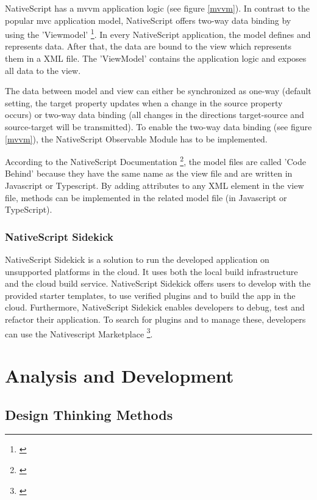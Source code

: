 NativeScript has a \ac{mvvm} application logic (see figure \ref{mvvm}). In contrast to the popular \ac{mvc} application model, NativeScript offers two-way data binding by using the 'Viewmodel' \footnote{\cite{nativescript}}. In every NativeScript application, the model defines and represents data. After that, the data are bound to the view which represents them in a XML file. The 'ViewModel' contains the application logic and exposes all data to the view. 

The data between model and view can either be synchronized as one-way (default setting, the target property updates when a change in the source property occurs) or two-way data binding (all changes in the directions target-source and source-target will be transmitted). To enable the two-way data binding (see figure \ref{mvvm}), the NativeScript Observable Module has to be implemented. 

According to the NativeScript Documentation \footnote{\cite{nativescript}}, the model files are called 'Code Behind' because they have the same name as the view file and are written in Javascript or Typescript. By adding attributes to any XML element in the view file, methods can be implemented in the related model file (in Javascript or TypeScript). 

\subsubsection{NativeScript Sidekick}\label{Native}

NativeScript Sidekick is a solution to run the developed application on unsupported platforms in the cloud. It uses both the local build infrastructure and the cloud build service. NativeScript Sidekick offers users to develop with the provided starter templates, to use verified plugins and to build the app in the cloud. Furthermore, NativeScript Sidekick enables developers to debug, test and refactor their application. 
To search for plugins and to manage these, developers can use the Nativescript Marketplace \footnote{\cite{nsmarket}}.


\section{Analysis and Development}

\subsection{Design Thinking Methods}

